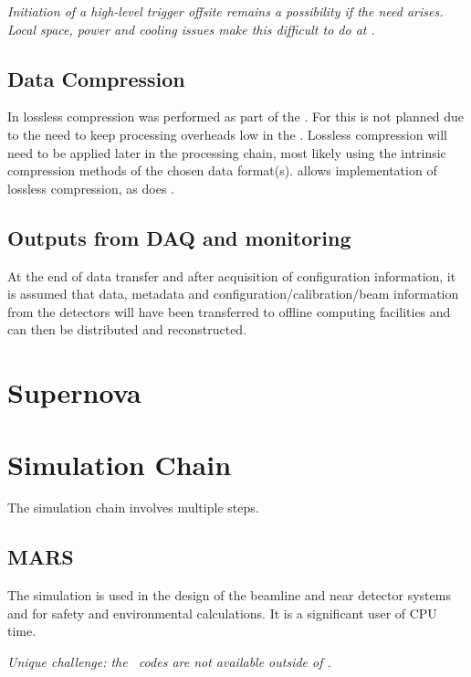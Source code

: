 \documentclass[../main-v1.tex]{subfiles}
\begin{document}
{\it  Initiation of a high-level trigger offsite remains a possibility if the need arises. Local space, power and cooling issues make this difficult to do at .}

\subsection{Data Compression}
In  lossless compression was performed as part of the . For  this is not planned due to the need to keep processing overheads low in the . Lossless compression will need to be applied later in the processing chain, most likely using the intrinsic compression methods of the chosen data format(s).   allows implementation of lossless compression, as does .


\subsection{Outputs from DAQ and monitoring}

At the end of data transfer and after acquisition of configuration information,  %
it is assumed that data, metadata and configuration/calibration/beam information from the detectors will have been transferred to offline computing facilities and can then be distributed and reconstructed. 

\section{Supernova }


\section{Simulation Chain }

% 
The simulation chain involves multiple steps.

\subsection{MARS}
The \cite{abs1} simulation is used in the design of the beamline and near detector systems and  for safety and environmental calculations.  It is a significant user of CPU time. 

{\it Unique challenge: the \ codes are not available outside of .}
\end{document}
